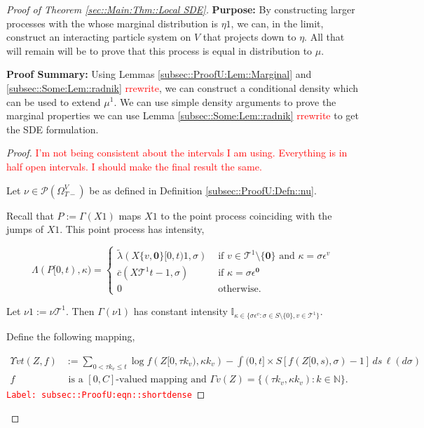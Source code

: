 \documentclass[12pt]{article}
\newcommand{\mb}{\mathbb}
\newcommand{\mc}{\mathcal}
\newcommand{\ov}{\overline}
\newcommand{\te}{\text}
\newcommand{\ep}{\epsilon}
\newcommand{\tr}{\textcolor{red}}
\newcommand{\labe}[1]{\tr{\texttt{Label: #1}}}
\newcommand{\purpose}{\textbf{Purpose: }}
\newcommand{\pfsum}{\textbf{Proof Summary: }}
\newcommand{\ind}{\hspace{24pt}}
\newcommand{\defeq}{:=}								%
\newcommand{\pmsr}{\mc{P}}							%
\renewcommand{\root}{\mathbf{0}}				%
\renewcommand{\v}{v}							%
\renewcommand{\S}{S}							%
\newcommand{\s}{\sigma}							%
\newcommand{\ev}{\ep}							%
\newcommand{\T}{T}								%
\renewcommand{\t}{t}							%
\newcommand{\sset}{\Omega}						%
\renewcommand{\tt}{s}							%
\newcommand{\X}{X}								%
\newcommand{\vind}[1]{^{#1}}					%
\newcommand{\vsi}[1]{^{#1}}						%
\newcommand{\ts}[1]{_{#1}}						%
\newcommand{\const}{C}							%
\newcommand{\IGrg}{\ov{c}}						%
\newcommand{\tree}{\mc{T}}						%
\newcommand{\sln}[1]{^{#1}}						%
\newcommand{\Sm}{\ell}							%
\newcommand{\alt}[1]{\widetilde{#1}}			%
\newcommand{\m}{\mu}							%
\newcommand{\mm}{\nu}							%
\newcommand{\mmm}{\eta}							%
\newcommand{\XXX}{Z}							%
\newcommand{\rt}{\tau}							%
\renewcommand{\it}{k}							%
\newcommand{\pmap}{\Gamma}						%
\renewcommand{\mark}{\kappa}					%
\newcommand{\rp}{P}								%
\newcommand{\ratee}{\Lambda}					%
\newcommand{\crate}{\alt{\lambda}}				%
\newcommand{\ds}{\Upsilon}						%
\begin{document}
\begin{proof}[Proof of Theorem \ref{sec::Main:Thm::Local SDE}]
\purpose By constructing larger processes with the whose marginal distribution is \(\mmm{}{}{1}\), we can, in the limit, construct an interacting particle system on \(V\) that projects down to \(\mmm{}{}{}\). All that will remain will be to prove that this process is equal in distribution to \(\m{}{}{}\).

\pfsum Using Lemmas \ref{subsec::ProofU:Lem::Marginal} and \ref{subsec::Some:Lem::radnik} \tr{rrewrite}, we can construct a conditional density which can be used to extend \(\mu\sln{1}\). We can use simple density arguments to prove the marginal properties we can use Lemma \ref{subsec::Some:Lem::radnik} \tr{rrewrite} to get the SDE formulation.

\begin{proof}
\tr{I'm not being consistent about the intervals I am using. Everything is in half open intervals. I should make the final result the same.}

Let \(\mm{}{}{} \in \pmsr(\sset\vsi{V}\ts{\T-})\) be as defined in Definition \ref{subsec::ProofU:Defn::nu}.

\ind Recall that \(\rp{} \defeq \pmap{}(\X{}{}{1})\) maps \(\X{}{}{1}\) to the point process coinciding with the jumps of \(\X{}{}{1}\). This point process has intensity,

\[\ratee{}(\rp{}[0,\t),\mark{}) = \begin{cases}
\crate{}{}(\X{\{\v,\root\}}{[0,\t)}{1},\s) &\te{ if } \v\in \tree\sln{1}\setminus\{\root\}\te{ and } \mark{} = \s\ev\vind{\v}\\
\IGrg{}(\X{\tree\sln{1}}{\t-}{1},\s) &\te{ if } \mark{} = \s\ev\vind{\root}\\
0 &\te{ otherwise}.
\end{cases}\]

Let \(\mm{}{}{1} \defeq \mm{\tree\sln{1}}{}{}\). Then \(\pmap{}(\mm{}{}{1})\) has constant intensity \(\mb{I}_{\kappa \in\{\s\ev\vind{\v}:\s\in\S\setminus\{0\},\v\in\tree\sln{1}\}}\). 

\ind Define the following mapping,

\begin{align}
\ds{\v}{\t}(\XXX{}{},f) &\defeq \sum_{0 < \rt{\it}_\v \leq \t} \log{f(\XXX{}{[0,\rt{\it}_\v)},\mark{\it}_\v)} - \int{(0,\t]\times \S} [f(\XXX{}{[0,\tt)},\s) - 1]\,ds\,\Sm(d\s) \label{subsec::ProofU:eqn::shortdense}\\
f&\te{ is a }[0,\const{}] \te{-valued mapping and } \pmap{\v}(\XXX{}{}) = \{(\rt{\it}_\v,\mark{\it}_\v):\it\in\mb{N}\}.\nonumber
\end{align} 
\labe{subsec::ProofU:eqn::shortdense}


\end{proof}
\end{proof}
\end{document}
